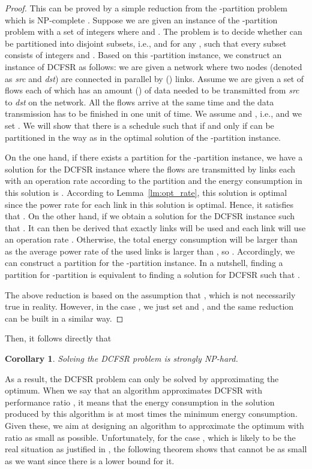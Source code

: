 \documentclass[10pt, conference, compsocconf]{IEEEtran}
\newtheorem{corollary}{Corollary}
\begin{document}
\begin{proof}
This can be proved by a simple reduction from the -partition problem which is NP-complete \cite{Garey_Johnson-1990}. Suppose we are given an instance of the -partition problem with a set  of  integers  where  and . The problem is to decide whether  can be partitioned into  disjoint subsets, i.e.,  and  for any , such that every subset  consists of  integers and . Based on this -partition instance, we construct an instance of DCFSR as follows: we are given a network where two nodes (denoted as \emph{src} and \emph{dst}) are connected in parallel by  () links. Assume we are given a set  of  flows each of which has an amount  () of data needed to be transmitted from \emph{src} to \emph{dst} on the network. All the flows arrive at the same time and the data transmission has to be finished in one unit of time. We assume  and , i.e.,  and we set . We will show that there is a schedule  such that  if and only if  can be partitioned in the way as in the optimal solution of the -partition instance.

On the one hand, if there exists a partition for the -partition instance, we have a solution  for the DCFSR instance where the flows are transmitted by  links each with an operation rate  according to the partition and the energy consumption in this solution is . According to Lemma~\ref{lm:opt_rate}, this solution is optimal since the power rate for each link in this solution is optimal. Hence, it satisfies that . On the other hand, if we obtain a solution  for the DCFSR instance such that . It can then be derived that exactly  links will be used and each link will use an operation rate . Otherwise, the total energy consumption  will be larger than  as the average power rate of the used links is larger than , so . Accordingly, we can construct a partition for the -partition instance. In a nutshell, finding a partition for -partition is equivalent to finding a solution  for DCFSR such that . 

The above reduction is based on the assumption that , which is not necessarily true in reality. However, in the case , we just set  and , and the same reduction can be built in a similar way.
\end{proof}
Then, it follows directly that
\begin{corollary}
Solving the DCFSR problem is strongly NP-hard.
\end{corollary}
As a result, the DCFSR problem can only be solved by approximating the optimum. When we say that an algorithm approximates DCFSR with performance ratio , it means that the energy consumption in the solution produced by this algorithm is at most  times the minimum energy consumption. Given these, we aim at designing an algorithm to approximate the optimum with ratio  as small as possible. Unfortunately, for the case , which is likely to be the real situation as justified in \cite{Wang_Zhang-JSAC-2013}, the following theorem shows that  cannot be as small as we want since there is a lower bound for it.
\end{document}
